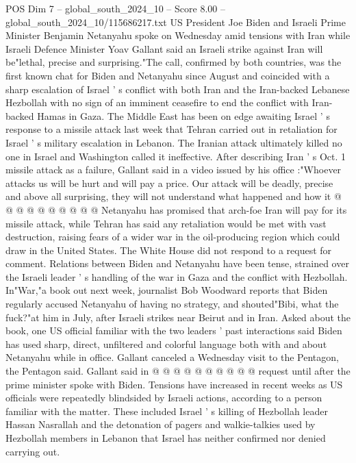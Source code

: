 \begin{textsample}{POS Dim 7 – global\_south\_2024\_10 – Score 8.00 – global\_south\_2024\_10/115686217.txt}  \label{ex:f7_pos_224}
US President Joe Biden and Israeli Prime Minister Benjamin Netanyahu spoke on Wednesday amid tensions with Iran while Israeli Defence Minister Yoav Gallant said an Israeli strike against Iran will be"lethal, precise and surprising."The call, confirmed by both countries, was the first known chat for Biden and Netanyahu since August and coincided with a sharp escalation of Israel ' s conflict with both Iran and the Iran-backed Lebanese Hezbollah with no sign of an imminent ceasefire to end the conflict with Iran-backed Hamas in Gaza.
The Middle East has been on edge awaiting Israel ' s response to a missile attack last week that Tehran carried out in retaliation for Israel ' s military escalation in Lebanon.
The Iranian attack ultimately killed no one in Israel and Washington called it ineffective.
After describing Iran ' s Oct. 1 missile attack as a failure, Gallant said in a video issued by his office :"Whoever attacks us will be hurt and will pay a price.
Our attack will be deadly, precise and above all surprising, they will not understand what happened and how it @ @ @ @ @ @ @ @ @ @ Netanyahu has promised that arch-foe Iran will pay for its missile attack, while Tehran has said any retaliation would be met with vast destruction, raising fears of a wider war in the oil-producing region which could draw in the United States.
The White House did not respond to a request for comment.
Relations between Biden and Netanyahu have been tense, strained over the Israeli leader ' s handling of the war in Gaza and the conflict with Hezbollah.
In"War,"a book out next week, journalist Bob Woodward reports that Biden regularly accused Netanyahu of having no strategy, and shouted"Bibi, what the fuck?"at him in July, after Israeli strikes near Beirut and in Iran.
Asked about the book, one US official familiar with the two leaders ' past interactions said Biden has used sharp, direct, unfiltered and colorful language both with and about Netanyahu while in office.
Gallant canceled a Wednesday visit to the Pentagon, the Pentagon said.
Gallant said in @ @ @ @ @ @ @ @ @ @ request until after the prime minister spoke with Biden.
Tensions have increased in recent weeks as US officials were repeatedly blindsided by Israeli actions, according to a person familiar with the matter.
These included Israel ' s killing of Hezbollah leader Hassan Nasrallah and the detonation of pagers and walkie-talkies used by Hezbollah members in Lebanon that Israel has neither confirmed nor denied carrying out.

\end{textsample}
